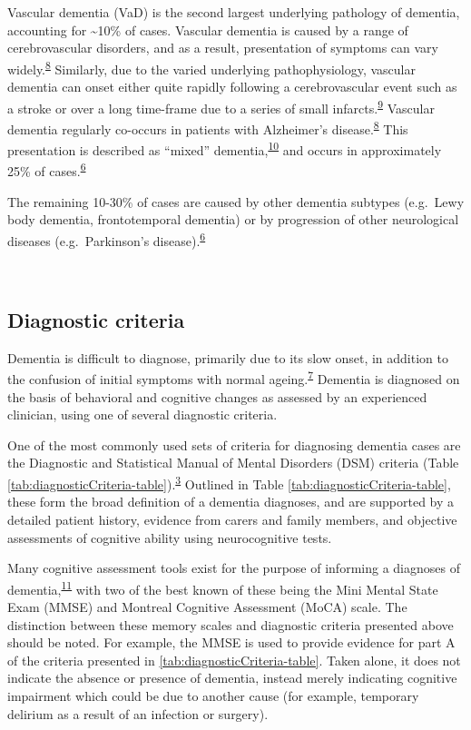 \documentclass[a4paper, twoside]{templates/ociamthesis}
\begin{document}
Vascular dementia (VaD) is the second largest underlying pathology of dementia, accounting for \textasciitilde10\% of cases. Vascular dementia is caused by a range of cerebrovascular disorders, and as a result, presentation of symptoms can vary widely.\textsuperscript{\protect\hyperlink{ref-iadecola2013}{8}} Similarly, due to the varied underlying pathophysiology, vascular dementia can onset either quite rapidly following a cerebrovascular event such as a stroke or over a long time-frame due to a series of small infarcts.\textsuperscript{\protect\hyperlink{ref-venkat2015}{9}} Vascular dementia regularly co-occurs in patients with Alzheimer's disease.\textsuperscript{\protect\hyperlink{ref-iadecola2013}{8}} This presentation is described as ``mixed'' dementia,\textsuperscript{\protect\hyperlink{ref-custodio2017}{10}} and occurs in approximately 25\% of cases.\textsuperscript{\protect\hyperlink{ref-burns2009}{6}}

The remaining 10-30\% of cases are caused by other dementia subtypes (e.g.~Lewy body dementia, frontotemporal dementia) or by progression of other neurological diseases (e.g.~Parkinson's disease).\textsuperscript{\protect\hyperlink{ref-burns2009}{6}}

~

\hypertarget{diagnostic-criteria}{%
\subsection{Diagnostic criteria}\label{diagnostic-criteria}}

Dementia is difficult to diagnose, primarily due to its slow onset, in addition to the confusion of initial symptoms with normal ageing.\textsuperscript{\protect\hyperlink{ref-robinson2015}{7}} Dementia is diagnosed on the basis of behavioral and cognitive changes as assessed by an experienced clinician, using one of several diagnostic criteria.

One of the most commonly used sets of criteria for diagnosing dementia cases are the Diagnostic and Statistical Manual of Mental Disorders (DSM) criteria (Table \ref{tab:diagnosticCriteria-table}).\textsuperscript{\protect\hyperlink{ref-edition2013}{3}} Outlined in Table \ref{tab:diagnosticCriteria-table}, these form the broad definition of a dementia diagnoses, and are supported by a detailed patient history, evidence from carers and family members, and objective assessments of cognitive ability using neurocognitive tests.

Many cognitive assessment tools exist for the purpose of informing a diagnoses of dementia,\textsuperscript{\protect\hyperlink{ref-sheehan2012}{11}} with two of the best known of these being the Mini Mental State Exam (MMSE) and Montreal Cognitive Assessment (MoCA) scale. The distinction between these memory scales and diagnostic criteria presented above should be noted. For example, the MMSE is used to provide evidence for part A of the criteria presented in \ref{tab:diagnosticCriteria-table}. Taken alone, it does not indicate the absence or presence of dementia, instead merely indicating cognitive impairment which could be due to another cause (for example, temporary delirium as a result of an infection or surgery).
\end{document}
